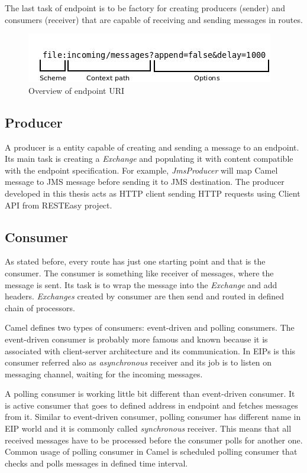\documentclass[12pt,final,oneside]{fithesis2}
\begin{document}
The last task of endpoint is to be factory for creating producers (sender) and consumers (receiver) that are capable of receiving and sending messages in routes.

\begin{figure}
\centering
\includegraphics[width=0.9\linewidth]{images/Diagram1.jpeg}
\caption{Overview of endpoint URI}
\label{uri}
\end{figure}

\subsection*{Producer}
A producer is a entity capable of creating and sending a message to an endpoint. Its main task is creating a \textit{Exchange} and populating it with content compatible with the endpoint specification. For example, \textit{JmsProducer} will map Camel message to JMS message before sending it to JMS destination. The producer developed in this thesis acts as HTTP client sending HTTP requests using Client API from RESTEasy project.


\subsection*{Consumer} 
As stated before, every route has just one starting point and that is the consumer. The consumer is something like receiver of messages, where the message is sent. Its task is to wrap the message into the \textit{Exchange} and add headers. \textit{Exchanges} created by consumer are then send and routed in defined chain of processors.

Camel defines two types of consumers: event-driven and polling consumers. The event-driven consumer is probably more famous and known because it is associated with client-server architecture and its communication. In EIPs is this consumer referred also as \textit{asynchronous} receiver and its job is to listen on messaging channel, waiting for the incoming messages.

A polling consumer is working little bit different than event-driven consumer. It is active consumer that goes to defined address in endpoint and fetches messages from it. Similar to event-driven consumer, polling consumer has different name in EIP world and it is commonly called \textit{synchronous} receiver. This means that all received messages have to be processed before the consumer polls for another one. Common usage of polling consumer in Camel is scheduled polling consumer that checks and polls messages in defined time interval.
\end{document}
